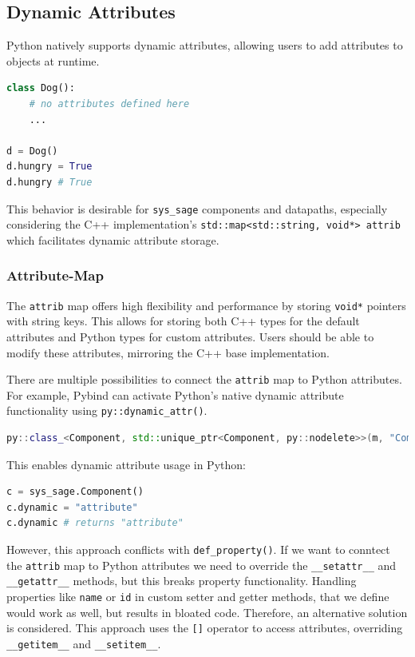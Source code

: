 \subsection{Dynamic Attributes}

Python natively supports dynamic attributes, allowing users to add attributes to objects at runtime.

\begin{lstlisting}[language=Python, xleftmargin=4em, frame = single]
class Dog():
    # no attributes defined here
    ...

d = Dog()
d.hungry = True
d.hungry # True
\end{lstlisting}

This behavior is desirable for \verb|sys_sage| components and datapaths, especially considering the C++ implementation's \verb|std::map<std::string, void*> attrib| which facilitates dynamic attribute storage.

\subsubsection{Attribute-Map}

The \verb|attrib| map offers high flexibility and performance by storing \verb|void*| pointers with string keys. This allows for storing both C++ types for the default attributes and Python types for custom attributes. Users should be able to modify these attributes, mirroring the C++ base implementation.

There are multiple possibilities to connect the \verb|attrib| map to Python attributes. For example, Pybind can activate Python's native dynamic attribute functionality using \verb|py::dynamic_attr()|. \cite[see The Basics/Object-Oriented Code]{pybind11-docu}

\begin{lstlisting}[language=C++, xleftmargin=4em, frame = single]
py::class_<Component, std::unique_ptr<Component, py::nodelete>>(m, "Component", py::dynamic_attr(),"Generic Component");
\end{lstlisting}

This enables dynamic attribute usage in Python:

\begin{lstlisting}[language=Python, xleftmargin=4em, frame = single]
c = sys_sage.Component()
c.dynamic = "attribute"
c.dynamic # returns "attribute"
\end{lstlisting}

However, this approach conflicts with \verb|def_property()|. If we want to conntect the \verb|attrib| map to Python attributes we need to override the \verb|__setattr__| and \verb|__getattr__| methods, but this breaks property functionality. Handling properties like \verb|name| or \verb|id| in custom setter and getter methods, that we define would work as well, but results in bloated code. Therefore, an alternative solution is considered. This approach uses the \verb|[]| operator to access attributes, overriding \verb|__getitem__| and \verb|__setitem__|.\cite[see Reference/Convenience classes for arbitrary Python Types]{pybind11-docu}\cite{python-getitem}

